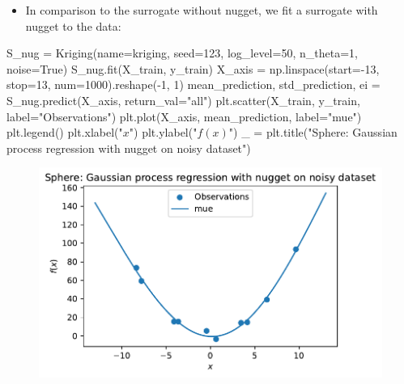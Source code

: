 \documentclass[
  letterpaper,
  DIV=11,
  numbers=noendperiod]{scrreprt}
\newenvironment{Shaded}{\begin{snugshade}}{\end{snugshade}}
\newcommand{\DecValTok}[1]{\textcolor[rgb]{0.68,0.00,0.00}{#1}}
\newcommand{\NormalTok}[1]{\textcolor[rgb]{0.00,0.23,0.31}{#1}}
\newcommand{\OperatorTok}[1]{\textcolor[rgb]{0.37,0.37,0.37}{#1}}
\newcommand{\StringTok}[1]{\textcolor[rgb]{0.13,0.47,0.30}{#1}}
\newcommand{\VariableTok}[1]{\textcolor[rgb]{0.07,0.07,0.07}{#1}}
\providecommand{\tightlist}{%
  \setlength{\itemsep}{0pt}\setlength{\parskip}{0pt}}\usepackage{longtable,booktabs,array}
\begin{document}
\begin{itemize}
\tightlist
\item
  In comparison to the surrogate without nugget, we fit a surrogate with
  nugget to the data:
\end{itemize}

\begin{Shaded}
\begin{Highlighting}[]
\NormalTok{S\_nug }\OperatorTok{=}\NormalTok{ Kriging(name}\OperatorTok{=}\StringTok{\textquotesingle{}kriging\textquotesingle{}}\NormalTok{,}
\NormalTok{            seed}\OperatorTok{=}\DecValTok{123}\NormalTok{,}
\NormalTok{            log\_level}\OperatorTok{=}\DecValTok{50}\NormalTok{,}
\NormalTok{            n\_theta}\OperatorTok{=}\DecValTok{1}\NormalTok{,}
\NormalTok{            noise}\OperatorTok{=}\VariableTok{True}\NormalTok{)}
\NormalTok{S\_nug.fit(X\_train, y\_train)}
\NormalTok{X\_axis }\OperatorTok{=}\NormalTok{ np.linspace(start}\OperatorTok{={-}}\DecValTok{13}\NormalTok{, stop}\OperatorTok{=}\DecValTok{13}\NormalTok{, num}\OperatorTok{=}\DecValTok{1000}\NormalTok{).reshape(}\OperatorTok{{-}}\DecValTok{1}\NormalTok{, }\DecValTok{1}\NormalTok{)}
\NormalTok{mean\_prediction, std\_prediction, ei }\OperatorTok{=}\NormalTok{ S\_nug.predict(X\_axis, return\_val}\OperatorTok{=}\StringTok{"all"}\NormalTok{)}
\NormalTok{plt.scatter(X\_train, y\_train, label}\OperatorTok{=}\StringTok{"Observations"}\NormalTok{)}
\NormalTok{plt.plot(X\_axis, mean\_prediction, label}\OperatorTok{=}\StringTok{"mue"}\NormalTok{)}
\NormalTok{plt.legend()}
\NormalTok{plt.xlabel(}\StringTok{"$x$"}\NormalTok{)}
\NormalTok{plt.ylabel(}\StringTok{"$f(x)$"}\NormalTok{)}
\NormalTok{\_ }\OperatorTok{=}\NormalTok{ plt.title(}\StringTok{"Sphere: Gaussian process regression with nugget on noisy dataset"}\NormalTok{)}
\end{Highlighting}
\end{Shaded}

\begin{figure}[H]

{\centering \includegraphics{013_num_spot_noisy_files/figure-pdf/cell-15-output-1.pdf}

}

\end{figure}
\end{document}
